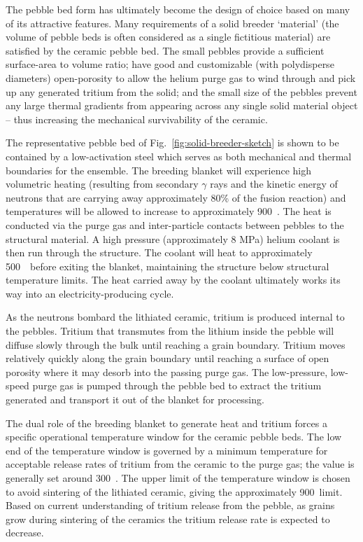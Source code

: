 The pebble bed form has ultimately become the design of choice based on many of its attractive features. Many requirements of a solid breeder `material' (the volume of pebble beds is often considered as a single fictitious material) are satisfied by the ceramic pebble bed. The small pebbles provide a sufficient surface-area to volume ratio; have good and customizable (with polydisperse diameters) open-porosity to allow the helium purge gas to wind through and pick up any generated tritium from the solid; and the small size of the pebbles prevent any large thermal gradients from appearing across any single solid material object -- thus increasing the mechanical survivability of the ceramic. 

The representative pebble bed of Fig.~\ref{fig:solid-breeder-sketch} is shown to be contained by a low-activation steel which serves as both mechanical and thermal boundaries for the ensemble. The breeding blanket will experience high volumetric heating (resulting from secondary $\gamma$ rays and the kinetic energy of neutrons that are carrying away approximately 80\% of the fusion reaction) and temperatures will be allowed to increase to approximately 900~\celsius. The heat is conducted via the purge gas and inter-particle contacts between pebbles to the structural material. A high pressure (approximately 8 MPa) helium coolant is then run through the structure. The coolant will heat to approximately 500~\celsius~before exiting the blanket, maintaining the structure below structural temperature limits. The heat carried away by the coolant ultimately works its way into an electricity-producing cycle. 

As the neutrons bombard the lithiated ceramic, tritium is produced internal to the pebbles. Tritium that transmutes from the lithium inside the pebble will diffuse slowly through the bulk until reaching a grain boundary. Tritium moves relatively quickly along the grain boundary until reaching a surface of open porosity where it may desorb into the passing purge gas.\cite{Federici1990} The low-pressure, low-speed purge gas is pumped through the pebble bed to extract the tritium generated and transport it out of the blanket for processing. 

The dual role of the breeding blanket to generate heat and tritium forces a specific operational temperature window for the ceramic pebble beds. The low end of the temperature window is governed by a minimum temperature for acceptable release rates of tritium from the ceramic to the purge gas; the value is generally set around 300~\celsius. The upper limit of the temperature window is chosen to avoid sintering of the lithiated ceramic, giving the approximately 900~\celsius limit. Based on current understanding of tritium release from the pebble, as grains grow during sintering of the ceramics the tritium release rate is expected to decrease.

